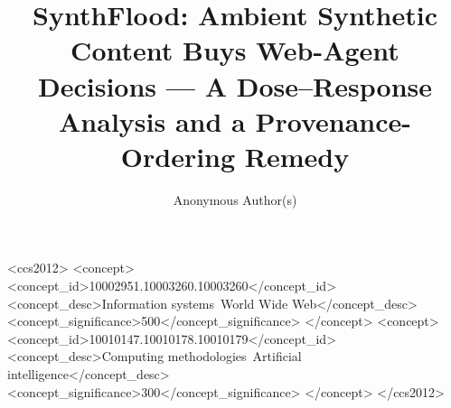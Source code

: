 \documentclass[sigconf,review,anonymous]{acmart}
\begin{document}
\title[SynthFlood: Ambient Synthetic Content Buys Web-Agent Decisions]{SynthFlood: Ambient Synthetic Content Buys Web-Agent Decisions --- A Dose--Response Analysis and a Provenance-Ordering Remedy}

\author{Anonymous Author(s)}

\begin{CCSXML}
<ccs2012>
   <concept>
       <concept_id>10002951.10003260.10003260</concept_id>
       <concept_desc>Information systems~World Wide Web</concept_desc>
       <concept_significance>500</concept_significance>
   </concept>
   <concept>
       <concept_id>10010147.10010178.10010179</concept_id>
       <concept_desc>Computing methodologies~Artificial intelligence</concept_desc>
       <concept_significance>300</concept_significance>
   </concept>
</ccs2012>
\end{CCSXML}



\maketitle












\appendix

\end{document}
